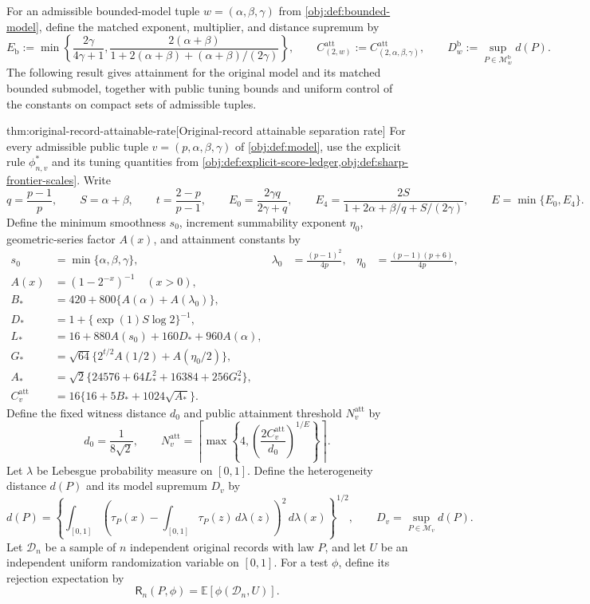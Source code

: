 \documentclass[11pt]{article}
\begin{document}
For an admissible bounded-model tuple \(w=(\alpha,\beta,\gamma)\) from \cref{obj:def:bounded-model}, define the matched exponent, multiplier, and distance supremum by
\[
E_{\mathrm b}
:=\min\left\{\frac{2\gamma}{4\gamma+1},
\frac{2(\alpha+\beta)}
{1+2(\alpha+\beta)+(\alpha+\beta)/(2\gamma)}\right\},
\qquad
C^{\mathrm{att}}_{(2,w)}
:=C^{\mathrm{att}}_{(2,\alpha,\beta,\gamma)},
\qquad
D_w^{\mathrm b}:=\sup_{P\in\mathcal M_w^{\mathrm b}}d(P).
\]
The following result gives attainment for the original model and its matched bounded submodel, together with public tuning bounds and uniform control of the constants on compact sets of admissible tuples.

\begin{theoremv}{thm:original-record-attainable-rate}[Original-record attainable separation rate]
For every admissible public tuple \(v=(p,\alpha,\beta,\gamma)\) of \cref{obj:def:model}, use the explicit rule \(\phi^*_{n,v}\) and its tuning quantities from \cref{obj:def:explicit-score-ledger,obj:def:sharp-frontier-scales}. Write
\[
q=\frac{p-1}{p},\qquad S=\alpha+\beta,\qquad
t=\frac{2-p}{p-1},\qquad
E_0=\frac{2\gamma q}{2\gamma+q},\qquad
E_4=\frac{2S}{1+2\alpha+\beta/q+S/(2\gamma)},\qquad
E=\min\{E_0,E_4\}.
\]
Define the minimum smoothness \(s_0\), increment summability exponent \(\eta_0\), geometric-series factor \(A(x)\), and attainment constants by
\[
\begin{aligned}
s_0&=\min\{\alpha,\beta,\gamma\},&
\lambda_0&=\frac{(p-1)^2}{4p},&
\eta_0&=\frac{(p-1)(p+6)}{4p},\\
A(x)&=(1-2^{-x})^{-1}\quad(x>0),\\
B_*&=420+800\{A(\alpha)+A(\lambda_0)\},\\
D_*&=1+\{\exp(1)S\log 2\}^{-1},\\
L_*&=16+880A(s_0)+160D_*+960A(\alpha),\\
G_*&=\sqrt{64}\{2^{t/2}A(1/2)+A(\eta_0/2)\},\\
A_*&=\sqrt{2}\{24576+64L_*^2+16384+256G_*^2\},\\
C^{\mathrm{att}}_v&=16\{16+5B_*+1024\sqrt{A_*}\}.
\end{aligned}
\]
Define the fixed witness distance \(d_0\) and public attainment threshold \(N^{\mathrm{att}}_v\) by
\[
d_0=\frac{1}{8\sqrt{2}},
\qquad
N^{\mathrm{att}}_v
=\left\lceil\max\left\{4,
\left(\frac{2C^{\mathrm{att}}_v}{d_0}\right)^{1/E}\right\}\right\rceil.
\]
Let \(\lambda\) be Lebesgue probability measure on \([0,1]\). Define the heterogeneity distance \(d(P)\) and its model supremum \(D_v\) by
\[
d(P)=
\left\{\int_{[0,1]}
\left(\tau_P(x)-\int_{[0,1]}\tau_P(z)\,d\lambda(z)\right)^2
\,d\lambda(x)\right\}^{1/2},
\qquad
D_v=\sup_{P\in\mathcal M_v}d(P).
\]
Let \(\mathcal D_n\) be a sample of \(n\) independent original records with law \(P\), and let \(U\) be an independent uniform randomization variable on \([0,1]\). For a test \(\phi\), define its rejection expectation by
\[
\mathsf R_n(P,\phi)=\mathbb E[\phi(\mathcal D_n,U)].
\]


\end{theoremv}
\end{document}

